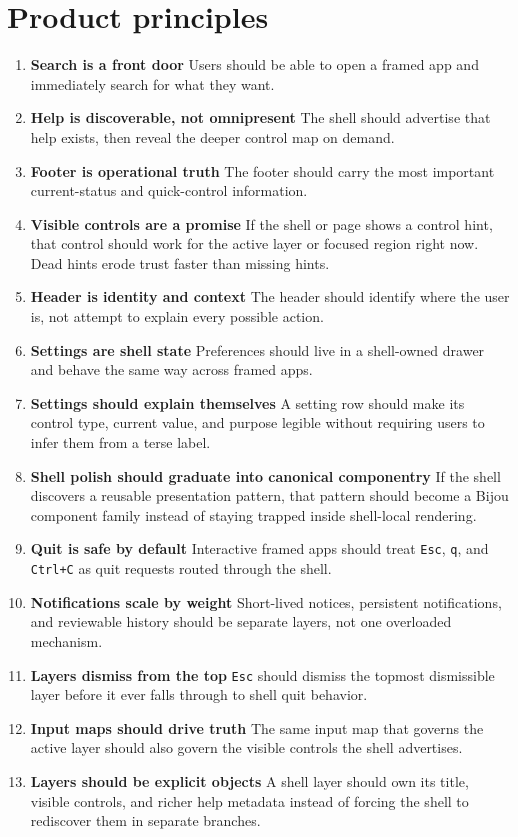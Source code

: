 \section{Product principles}\label{record-047-product-principles}

\begin{enumerate}
\def\labelenumi{\arabic{enumi}.}
\item
  \textbf{Search is a front door} Users should be able to open a framed app and immediately search for what they want.
\item
  \textbf{Help is discoverable, not omnipresent} The shell should advertise that help exists, then reveal the deeper control map on demand.
\item
  \textbf{Footer is operational truth} The footer should carry the most important current-status and quick-control information.
\item
  \textbf{Visible controls are a promise} If the shell or page shows a control hint, that control should work for the active layer or focused region right now. Dead hints erode trust faster than missing hints.
\item
  \textbf{Header is identity and context} The header should identify where the user is, not attempt to explain every possible action.
\item
  \textbf{Settings are shell state} Preferences should live in a shell-owned drawer and behave the same way across framed apps.
\item
  \textbf{Settings should explain themselves} A setting row should make its control type, current value, and purpose legible without requiring users to infer them from a terse label.
\item
  \textbf{Shell polish should graduate into canonical componentry} If the shell discovers a reusable presentation pattern, that pattern should become a Bijou component family instead of staying trapped inside shell-local rendering.
\item
  \textbf{Quit is safe by default} Interactive framed apps should treat \texttt{E\allowbreak{}s\allowbreak{}c}, \texttt{q}, and \texttt{C\allowbreak{}t\allowbreak{}r\allowbreak{}l\allowbreak{}+\allowbreak{}C} as quit requests routed through the shell.
\item
  \textbf{Notifications scale by weight} Short-lived notices, persistent notifications, and reviewable history should be separate layers, not one overloaded mechanism.
\item
  \textbf{Layers dismiss from the top} \texttt{E\allowbreak{}s\allowbreak{}c} should dismiss the topmost dismissible layer before it ever falls through to shell quit behavior.
\item
  \textbf{Input maps should drive truth} The same input map that governs the active layer should also govern the visible controls the shell advertises.
\item
  \textbf{Layers should be explicit objects} A shell layer should own its title, visible controls, and richer help metadata instead of forcing the shell to rediscover them in separate branches.
\end{enumerate}


